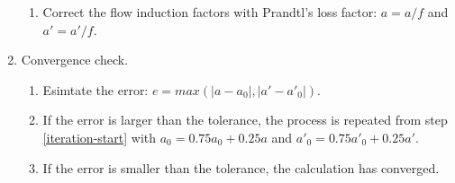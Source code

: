 \begin{enumerate}
\begin{enumerate}
		\item Correct the flow induction factors with Prandtl's loss factor: $ a = a/f $ and $ a' = a'/f $.
		
	\end{enumerate}
	
	\item Convergence check.
	
	\begin{enumerate}
		
		\item Esimtate the error: $ e = max(|a-a_0|, |a'-a'_0|) $.
		
		\item If the error is larger than the tolerance, the process is repeated from step \ref{iteration-start} with $ a_0 = 0.75 a_0 + 0.25 a $ and $ a'_0 = 0.75 a'_0 + 0.25 a' $.
		
		\item If the error is smaller than the tolerance, the calculation has converged.
		
	\end{enumerate}
	
\end{enumerate}
